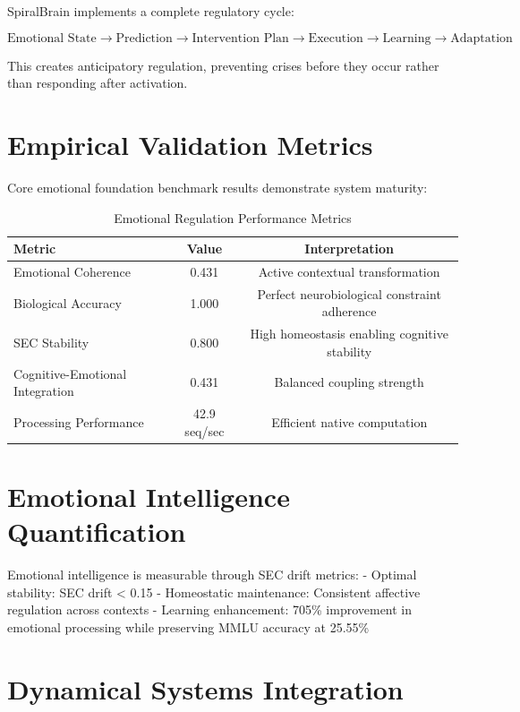 \documentclass[12pt,a4paper]{article}
\begin{document}
SpiralBrain implements a complete regulatory cycle:

\[
\text{Emotional State} \rightarrow \text{Prediction} \rightarrow \text{Intervention Plan} \rightarrow \text{Execution} \rightarrow \text{Learning} \rightarrow \text{Adaptation}
\]

This creates anticipatory regulation, preventing crises before they occur rather than responding after activation.

\section{Empirical Validation Metrics}

Core emotional foundation benchmark results demonstrate system maturity:

\begin{table}[H]
\centering
\caption{Emotional Regulation Performance Metrics}
\label{tab:emotional_metrics}
\begin{tabular}{@{}lcc@{}}
\toprule
Metric & Value & Interpretation \\
\midrule
Emotional Coherence & 0.431 & Active contextual transformation \\
Biological Accuracy & 1.000 & Perfect neurobiological constraint adherence \\
SEC Stability & 0.800 & High homeostasis enabling cognitive stability \\
Cognitive-Emotional Integration & 0.431 & Balanced coupling strength \\
Processing Performance & 42.9 seq/sec & Efficient native computation \\
\bottomrule
\end{tabular}
\end{table}

\section{Emotional Intelligence Quantification}

Emotional intelligence is measurable through SEC drift metrics:
- Optimal stability: SEC drift < 0.15
- Homeostatic maintenance: Consistent affective regulation across contexts
- Learning enhancement: 705\% improvement in emotional processing while preserving MMLU accuracy at 25.55\%

\section{Dynamical Systems Integration}
\end{document}
